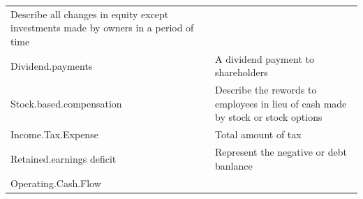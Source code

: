\documentclass[11pt,]{article}
\begin{document}
\begin{longtable}[]{@{}lll@{}}
\begin{minipage}[t]{0.62\columnwidth}
Describe all changes in equity except investments made by owners in a
period of time\strut
\end{minipage}\tabularnewline
\begin{minipage}[t]{0.19\columnwidth}\raggedright
Dividend.payments\strut
\end{minipage} & \begin{minipage}[t]{0.10\columnwidth}\raggedright
\strut
\end{minipage} & \begin{minipage}[t]{0.62\columnwidth}\raggedright
A dividend payment to shareholders\strut
\end{minipage}\tabularnewline
\begin{minipage}[t]{0.19\columnwidth}\raggedright
Stock.based.compensation\strut
\end{minipage} & \begin{minipage}[t]{0.10\columnwidth}\raggedright
\strut
\end{minipage} & \begin{minipage}[t]{0.62\columnwidth}\raggedright
Describe the rewords to employees in lieu of cash made by stock or stock
options\strut
\end{minipage}\tabularnewline
\begin{minipage}[t]{0.19\columnwidth}\raggedright
Income.Tax.Expense\strut
\end{minipage} & \begin{minipage}[t]{0.10\columnwidth}\raggedright
\strut
\end{minipage} & \begin{minipage}[t]{0.62\columnwidth}\raggedright
Total amount of tax\strut
\end{minipage}\tabularnewline
\begin{minipage}[t]{0.19\columnwidth}\raggedright
Retained.earnings deficit\strut
\end{minipage} & \begin{minipage}[t]{0.10\columnwidth}\raggedright
\strut
\end{minipage} & \begin{minipage}[t]{0.62\columnwidth}\raggedright
Represent the negative or debt banlance\strut
\end{minipage}\tabularnewline
\begin{minipage}[t]{0.19\columnwidth}\raggedright
Operating.Cash.Flow\strut
\end{minipage} & \begin{minipage}[t]{0.10\columnwidth}\raggedright
\strut
\end{minipage} & \begin{minipage}[t]{0.62\columnwidth}\raggedright

\end{minipage}
\end{longtable}
\end{document}
